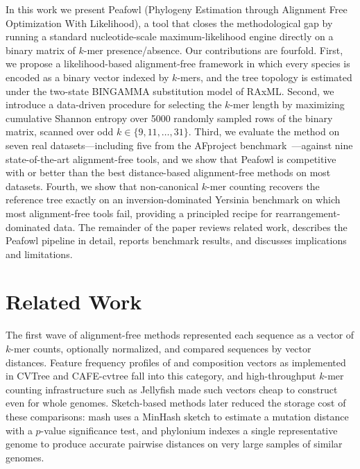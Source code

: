 \documentclass[11pt]{article}
\begin{document}
In this work we present Peafowl (Phylogeny Estimation through Alignment Free
Optimization With Likelihood), a tool that closes the methodological gap by
running a standard nucleotide-scale maximum-likelihood engine
\citep{stamatakis2014raxml} directly on a binary matrix of $k$-mer
presence/absence. Our contributions are fourfold. First, we propose a
likelihood-based alignment-free framework in which every species is encoded as
a binary vector indexed by $k$-mers, and the tree topology is estimated under
the two-state BINGAMMA substitution model of RAxML. Second, we introduce a
data-driven procedure for selecting the $k$-mer length by maximizing
cumulative Shannon entropy \citep{shannon1948mathematical} over 5000 randomly
sampled rows of the binary matrix, scanned over odd
$k \in \{9, 11, \ldots, 31\}$. Third, we evaluate the method on seven real
datasets---including five from the AFproject
benchmark~\citep{zielezinski2019afproject}---against nine state-of-the-art
alignment-free tools, and we show that Peafowl is competitive with or better
than the best distance-based alignment-free methods on most datasets.
Fourth, we show that non-canonical $k$-mer counting recovers the reference
tree exactly on an inversion-dominated Yersinia benchmark on which most
alignment-free tools fail, providing a principled recipe for
rearrangement-dominated data. The remainder of the paper reviews related
work, describes the Peafowl pipeline in detail, reports benchmark results,
and discusses implications and limitations.

\section{Related Work}

The first wave of alignment-free methods represented each sequence as a vector
of $k$-mer counts, optionally normalized, and compared sequences by vector
distances. Feature frequency profiles of \citet{sims2009ffp} and composition
vectors as implemented in CVTree and CAFE-cvtree
\citep{gao2007cvtree, lu2017cafe} fall into this category, and
high-throughput $k$-mer counting infrastructure such as Jellyfish
\citep{marcais2011jellyfish} made such vectors cheap to construct even for
whole genomes. Sketch-based methods later reduced the storage cost of these
comparisons: mash \citep{ondov2016mash} uses a MinHash sketch to estimate a
mutation distance with a $p$-value significance test, and phylonium
\citep{klotzl2020phylonium} indexes a single representative genome to produce
accurate pairwise distances on very large samples of similar genomes.
\end{document}
